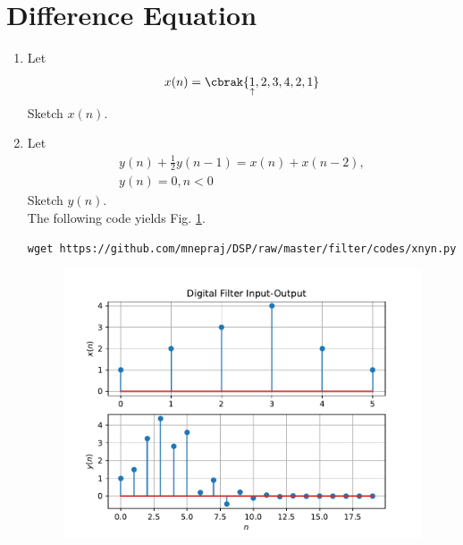 \documentclass[journal, 12pt, twocolumn]{IEEEtran}
\renewcommand\thesection{\arabic{section}}
\begin{document}
\section{Difference Equation}
\begin{enumerate}[label=\thesection.\arabic*,ref=\thesection.\theenumi]
	\item Let
	      \begin{equation}
		      x(n) = \cbrak{\underset{\uparrow}{1},2,3,4,2,1}
	      \end{equation}
	      Sketch $x(n)$.
	\item Let
	      \begin{multline}
		      \label{eq:iir_filter}
		      y(n) + \frac{1}{2}y(n-1) = x(n) + x(n-2),
		      \\
		      y(n) = 0, n < 0
	      \end{multline}
	      Sketch $y(n)$.
	      \\
	      \solution The following code yields Fig. \ref{fig:xnyn}.
	      \begin{lstlisting}
wget https://github.com/mnepraj/DSP/raw/master/filter/codes/xnyn.py
\end{lstlisting}
	      \begin{figure}[!ht]
		      \begin{center}
			      \includegraphics[width=\columnwidth]{./figs/xnyn}
		      \end{center}
		      \label{fig:xnyn}
	      \end{figure}

\end{enumerate}
\end{document}
